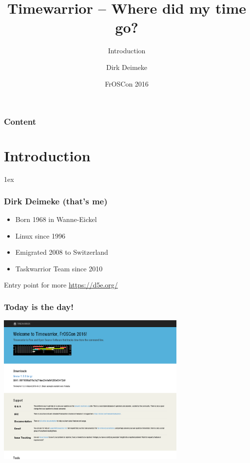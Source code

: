 \documentclass[t,handout]{beamer}
\title{Timewarrior -- Where did my time go?}
\subtitle{Introduction}
\author[Deimeke, Dirk]{Dirk Deimeke}
\institute[Taskwarrior academy]{Taskwarrior academy}
\date{FrOSCon 2016}
\begin{document}
\begin{frame} %
	\titlepage
\end{frame}


\begin{frame}\frametitle{Content}
	\tableofcontents
\end{frame}

\section{Introduction}

\parskip1ex

\begin{frame}[fragile]\frametitle{Dirk Deimeke (that's me)}
    \vfill
    \begin{itemize}
        \item Born 1968 in Wanne-Eickel
        \item Linux since 1996
        \item Emigrated 2008 to Switzerland
        \item Taskwarrior Team since 2010
    \end{itemize}

    Entry point for more \url{https://d5e.org/}
\end{frame}

\begin{frame}[fragile]\frametitle{Today is the day!}
    \vfill
    \begin{center}
        \href{http://timewarrior.net/}{\includegraphics[height=7.5cm]{timewarrior.png}}
    \end{center}
\end{frame}
\end{document}
